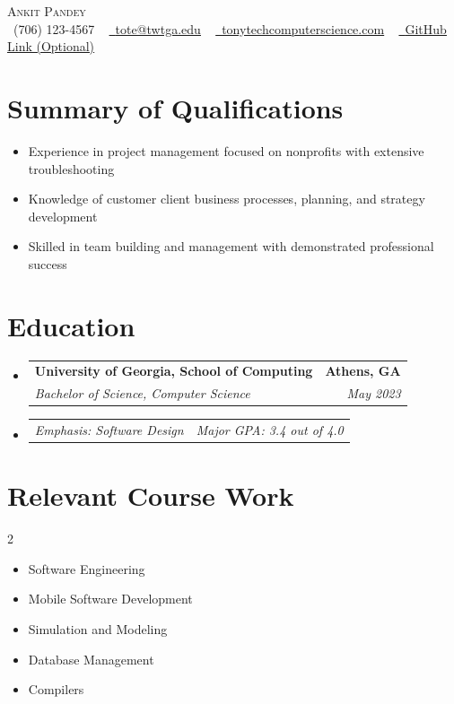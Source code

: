 \documentclass[letterpaper,11pt]{article}
\makeatletter
\newcommand{\resumeItem}[1]{
  \item\small{
    {#1 \vspace{-2pt}}
  }
}
\newcommand{\resumeSubheading}[4]{
  \vspace{-2pt}\item
    \begin{tabular*}{1.0\textwidth}[t]{l@{\extracolsep{\fill}}r}
      \textbf{#1} & \textbf{\small #2} \\
      \textit{\small#3} & \textit{\small #4} \\
    \end{tabular*}\vspace{-7pt}
}
\newcommand{\resumeSubSubheading}[2]{
    \item
    \begin{tabular*}{0.97\textwidth}{l@{\extracolsep{\fill}}r}
      \textit{\small#1} & \textit{\small #2} \\
    \end{tabular*}\vspace{-7pt}
}
\newcommand{\resumeSubHeadingListStart}{\begin{itemize}[leftmargin=0.0in, label={}]}
\newcommand{\resumeSubHeadingListEnd}{\end{itemize}}
\newcommand{\resumeItemListStart}{\begin{itemize}}
\newcommand{\resumeItemListEnd}{\end{itemize}\vspace{-5pt}}
\makeatother
\begin{document}
\begin{center}
    {\Huge \scshape Ankit Pandey} \\ \vspace{1pt}
    \small \raisebox{-0.1\height}\faPhone\ (706) 123-4567 ~ \href{mailto:tote@twtga.edu}{\raisebox{-0.2\height}\faEnvelope\  \underline{tote@twtga.edu}} ~ 
    \href{https://tonytechcomputerscience.com}{\raisebox{-0.2\height}\faGlobe\ \underline{tonytechcomputerscience.com}} ~
    \href{https://github.com/ankitpandey}{\raisebox{-0.2\height}\faGithub\ \underline{GitHub Link (Optional)}}
    \vspace{-8pt}
\end{center}

\section{Summary of Qualifications}
\resumeItemListStart
    \resumeItem{Experience in project management focused on nonprofits with extensive troubleshooting}
    \resumeItem{Knowledge of customer client business processes, planning, and strategy development}
    \resumeItem{Skilled in team building and management with demonstrated professional success}
\resumeItemListEnd

\section{Education}
  \resumeSubHeadingListStart
    \resumeSubheading
      {University of Georgia, School of Computing}{Athens, GA}
      {Bachelor of Science, Computer Science}{May 2023}
      \resumeSubSubheading{Emphasis: Software Design}{Major GPA: 3.4 out of 4.0}
  \resumeSubHeadingListEnd

\section{Relevant Course Work}
\begin{multicols}{2}
    \begin{itemize}[itemsep=-5pt, parsep=3pt]
        \item Software Engineering
        \item Mobile Software Development
        \item Simulation and Modeling
        \item Database Management
        \item Compilers
    \end{itemize}
\end{multicols}
\vspace*{2.0\multicolsep}
\end{document}
